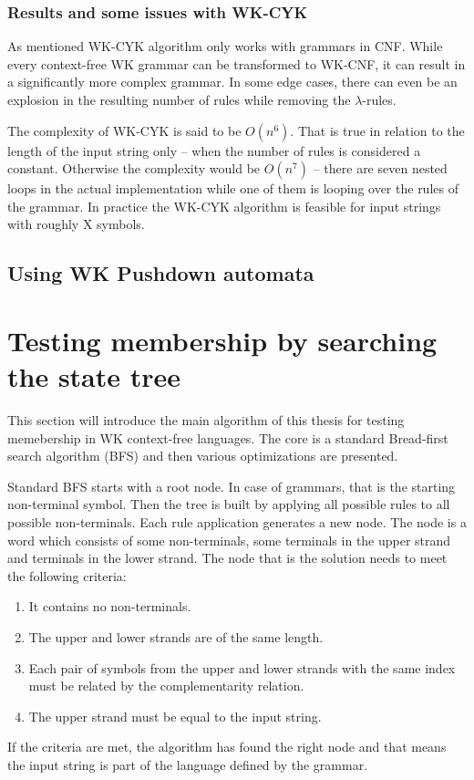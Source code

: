 \subsection{Results and some issues with WK-CYK}
As mentioned WK-CYK algorithm only works with grammars in CNF. While every context-free WK grammar can be transformed to WK-CNF, it can result in a significantly more complex grammar. In some edge cases, there can even be an explosion in the resulting number of rules while removing the $\lambda$-rules.

The complexity of WK-CYK is said to be $O(n^6)$. That is true in relation to the length of the input string only -- when the number of rules is considered a constant. Otherwise the complexity would be $O(n^7)$ -- there are seven nested loops in the actual implementation while one of them is looping over the rules of the grammar.
In practice the WK-CYK algorithm is feasible for input strings with roughly X symbols.




\section{Using WK Pushdown automata}

\chapter{Testing membership by searching the state tree}
This section will introduce the main algorithm of this thesis for testing memebership in WK context-free languages. The core is a standard Bread-first search algorithm (BFS) and then various optimizations are presented.

Standard BFS starts with a root node. In case of grammars, that is the starting non-terminal symbol. Then the tree is built by applying all possible rules to all possible non-terminals. Each rule application generates a new node. The node is a word which consists of some non-terminals, some terminals in the upper strand and terminals in the lower strand. The node that is the solution needs to meet the following criteria:
\begin{enumerate}
  \item{It contains no non-terminals.}
  \item{The upper and lower strands are of the same length.}
  \item{Each pair of symbols from the upper and lower strands with the same index must be related by the complementarity relation.}
  \item{The upper strand must be equal to the input string.}
\end{enumerate}
If the criteria are met, the algorithm has found the right node and that means the input string is part of the language defined by the grammar.

